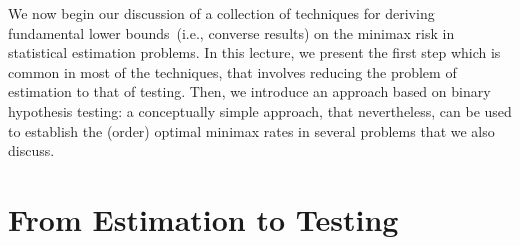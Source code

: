\documentclass[12pt]{article}
\begin{document}
	\MakeScribeTop

We now begin our discussion of a collection of techniques for deriving fundamental lower bounds~(i.e., converse results) on the minimax risk in statistical estimation problems. In this lecture, we present the first step which is common in most of the techniques, that involves reducing the problem of estimation to that of testing. Then, we introduce an approach based on binary hypothesis testing: a conceptually simple approach, that nevertheless, can be used to establish the (order) optimal  minimax rates in several problems that we also discuss. 

\section{From Estimation to Testing}
\label{sec:reduction-to-testing}
\end{document}
